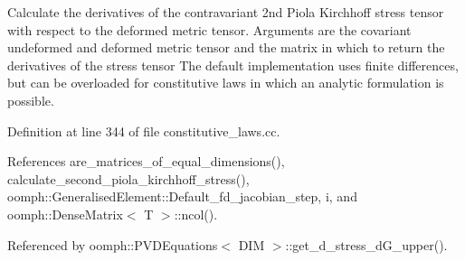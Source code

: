 Calculate the derivatives of the contravariant 2nd Piola Kirchhoff stress tensor with respect to the deformed metric tensor. Arguments are the covariant undeformed and deformed metric tensor and the matrix in which to return the derivatives of the stress tensor The default implementation uses finite differences, but can be overloaded for constitutive laws in which an analytic formulation is possible. 

Definition at line 344 of file constitutive\+\_\+laws.\+cc.



References are\+\_\+matrices\+\_\+of\+\_\+equal\+\_\+dimensions(), calculate\+\_\+second\+\_\+piola\+\_\+kirchhoff\+\_\+stress(), oomph\+::\+Generalised\+Element\+::\+Default\+\_\+fd\+\_\+jacobian\+\_\+step, i, and oomph\+::\+Dense\+Matrix$<$ T $>$\+::ncol().



Referenced by oomph\+::\+P\+V\+D\+Equations$<$ D\+I\+M $>$\+::get\+\_\+d\+\_\+stress\+\_\+d\+G\+\_\+upper().

\mbox{\label{classoomph_1_1ConstitutiveLaw_af13f9d05db09870d1b90b7ef389bdb71}} 
